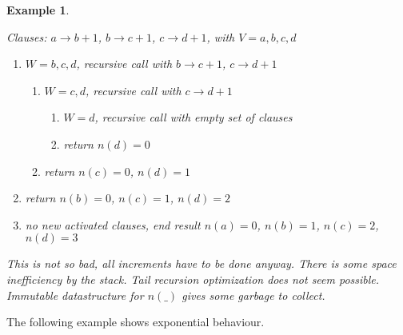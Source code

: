 \documentclass[11pt,a4paper]{article}
\newtheorem{example}{Example}[theorem]
\begin{document}
\begin{example}~\label{exa:abcd}

Clauses: $a \to b+1$, $b \to c+1$, $c \to d+1$, with
$V = a,b,c,d$

\begin{enumerate}
\item $W = b,c,d$, 
recursive call with $b \to c+1$, $c \to d+1$

\begin{enumerate}
\item  $W = c,d$, 
  recursive call with $c \to d+1$

\begin{enumerate}
\item  $W = d$,
    recursive call with empty set of clauses
\item     return $n(d) = 0$
\end{enumerate}

\item  return $n(c) = 0$,  $n(d) = 1$
\end{enumerate}

\item return $n(b) = 0$, $n(c) = 1$, $n(d) = 2$

\item no new activated clauses,
end result $n(a) = 0$, $n(b) = 1$, $n(c) = 2$, $n(d) = 3$
\end{enumerate}



This is not so bad, all increments have to be done anyway.
There is some space inefficiency by the stack.
Tail recursion optimization does not seem possible.
Immutable datastructure for $n(\_)$ gives some garbage to collect.

\end{example}

The following example shows exponential behaviour.
\end{document}
